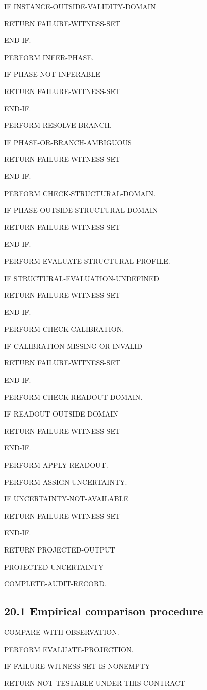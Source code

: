 \documentclass[11pt,oneside,openany]{book}
\newcommand{\PCsubsection}[1]{%
  \subsection*{#1}%
}
\begin{document}
IF INSTANCE-OUTSIDE-VALIDITY-DOMAIN

RETURN FAILURE-WITNESS-SET

END-IF.


PERFORM INFER-PHASE.

IF PHASE-NOT-INFERABLE

RETURN FAILURE-WITNESS-SET

END-IF.


PERFORM RESOLVE-BRANCH.

IF PHASE-OR-BRANCH-AMBIGUOUS

RETURN FAILURE-WITNESS-SET

END-IF.


PERFORM CHECK-STRUCTURAL-DOMAIN.

IF PHASE-OUTSIDE-STRUCTURAL-DOMAIN

RETURN FAILURE-WITNESS-SET

END-IF.


PERFORM EVALUATE-STRUCTURAL-PROFILE.

IF STRUCTURAL-EVALUATION-UNDEFINED

RETURN FAILURE-WITNESS-SET

END-IF.


PERFORM CHECK-CALIBRATION.

IF CALIBRATION-MISSING-OR-INVALID

RETURN FAILURE-WITNESS-SET

END-IF.


PERFORM CHECK-READOUT-DOMAIN.

IF READOUT-OUTSIDE-DOMAIN

RETURN FAILURE-WITNESS-SET

END-IF.


PERFORM APPLY-READOUT.

PERFORM ASSIGN-UNCERTAINTY.


IF UNCERTAINTY-NOT-AVAILABLE

RETURN FAILURE-WITNESS-SET

END-IF.


RETURN PROJECTED-OUTPUT

PROJECTED-UNCERTAINTY

COMPLETE-AUDIT-RECORD.

\PCsubsection{20.1 Empirical comparison procedure}

COMPARE-WITH-OBSERVATION.


PERFORM EVALUATE-PROJECTION.


IF FAILURE-WITNESS-SET IS NONEMPTY

RETURN NOT-TESTABLE-UNDER-THIS-CONTRACT
\end{document}
